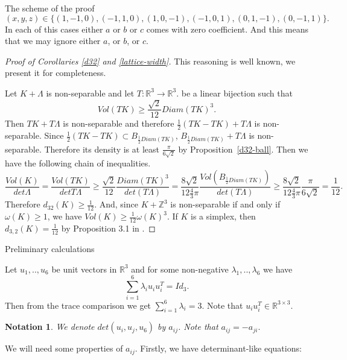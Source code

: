 \documentclass[12pt]{article}
\newtheorem{notation}{Notation}[section]
\begin{document}
\begin{section}{The scheme of the proof}
    $$(x,y,z)\in \{(1,-1,0),(-1,1,0),(1,0,-1),(-1,0,1),(0,1,-1), (0,-1,1)\}.$$  
    In each of this cases either $a$ or $b$ or $c$ comes with zero coefficient. And this means that we may ignore either $a$, or $b$, or $c$. 


    \begin{proof}[Proof of Corollaries \ref{d32} and \ref{lattice-width}]
        This reasoning is well known, we present it for completeness. 

        
        Let $K + \Lambda$ is non-separable and let $T:\mathbb{R}^3\to \mathbb{R}^3.$ be a linear bijection such that $$Vol(TK)\geq \frac{\sqrt{2}}{12}Diam(TK)^3.$$
        Then $TK + T\Lambda$ is non-separable and therefore $\frac{1}{2}(TK-TK) + T\Lambda$ is non-separable. Since $\frac{1}{2}(TK-TK)\subset B_{\frac{1}{2}Diam(TK)}$, $B_{\frac{1}{2}Diam(TK)} + T\Lambda$ is non-separable. Therefore its density is at least $\frac{\pi}{6\sqrt{2}}$ by Proposition~\ref{d32-ball}. Then we have the following chain of inequalities.
        $$
            \frac{Vol(K)}{det \Lambda} = \frac{Vol(TK)}{det T\Lambda} \geq \frac{\sqrt{2}}{12}\frac{Diam(TK)^3}{det (T\Lambda)} = \frac{8\sqrt{2}}{12\frac{4}{3}\pi}\frac{Vol(B_{\frac{1}{2}Diam(TK)})}{det (T\Lambda)} \geq \frac{8\sqrt{2}}{12\frac{4}{3}\pi}\frac{\pi}{6\sqrt{2}} = \frac{1}{12}.
        $$
        Therefore $d_{32}(K)\geq \frac{1}{12}.$ And, since $K+\mathbb{Z}^3$ is non-separable if and only if $\omega(K)\geq 1$, we have  $Vol(K)\geq \frac{1}{12}\omega(K)^3.$  If $K$ is a simplex, then  $d_{3,2}(K) = \frac{1}{12}$ by Proposition 3.1 in \cite{makai2016}.
        
    \end{proof}



\begin{section}{Preliminary calculations}

    Let $u_{1},..,u_{6}$ be unit vectors in $\mathbb{R}^{3}$ and for some non-negative 
    $\lambda_{1},..,\lambda_{6}$ we have 
    $$
        \sum_{i=1}^{6}\lambda_{i}u_{i}u_{i}^{T} = Id_{3}.
    $$    
Then from the trace comparison we get $\sum_{i=1}^{6} \lambda_{i} = 3.$ Note that $u_{i}u_{i}^{T}\in \mathbb{R}^{3\times 3}.$
    
    \begin{notation}
        We denote $det(u_{i},u_{j},u_{6})$ by $a_{ij}$. Note that $a_{ij} = -a_{ji}.$
    \end{notation}

    We will need some properties of $a_{ij}$. Firstly, we have determinant-like equations:
    

\end{section}
\end{section}
\end{document}
